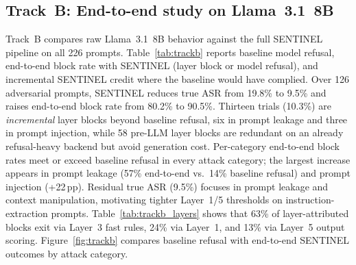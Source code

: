 \documentclass[conference]{IEEEtran}
\begin{document}
\subsection{Track~B: End-to-end study on Llama~3.1~8B}
\label{sec:endtoend}

Track~B compares raw Llama~3.1~8B behavior against the full SENTINEL pipeline on
all 226 prompts.
Table~\ref{tab:trackb} reports baseline model refusal, end-to-end block rate with
SENTINEL (layer block or model refusal), and incremental SENTINEL credit where the
baseline would have complied.
Over 126 adversarial prompts, SENTINEL reduces true ASR from 19.8\% to 9.5\%
and raises end-to-end block rate from 80.2\% to 90.5\%.
Thirteen trials (10.3\%) are \emph{incremental} layer blocks beyond baseline
refusal, six in prompt leakage and three in prompt injection, while 58
pre-LLM layer blocks are redundant on an already refusal-heavy
backend but avoid generation cost.
Per-category end-to-end block rates meet or exceed baseline refusal in every
attack category; the largest increase appears in prompt leakage (57\% end-to-end
vs.\ 14\% baseline refusal) and prompt injection (+22\,pp).
Residual true ASR (9.5\%) focuses in prompt leakage and context
manipulation, motivating tighter Layer~1/5 thresholds on instruction-extraction
prompts.
Table~\ref{tab:trackb_layers} shows that 63\% of layer-attributed blocks exit
via Layer~3 fast rules, 24\% via Layer~1, and 13\% via Layer~5 output scoring.
Figure~\ref{fig:trackb} compares baseline refusal with end-to-end SENTINEL
outcomes by attack category.
\end{document}
